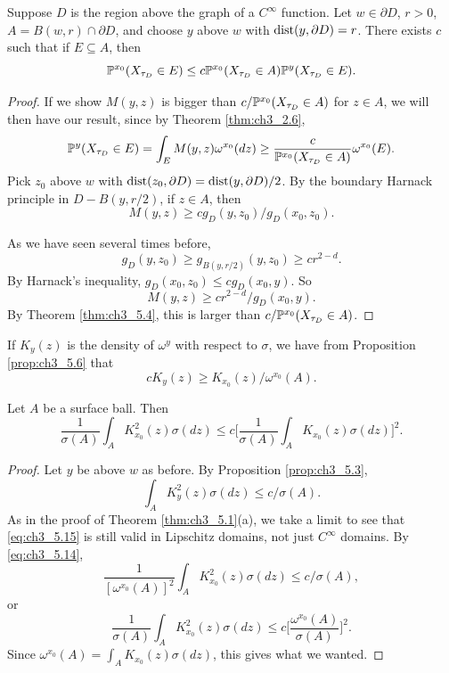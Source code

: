 \begin{proposition}\label{prop:ch3_5.6}
Suppose $D$ is the region above the graph of a $C^\infty$ function. Let $w \in \partial D$, $r > 0$, $A = B(w,r) \cap \partial D$, and choose $y$ above $w$ with $\dist(y,\partial D) = r$. There exists $c$ such that if $E \subseteq A$, then
\[
    \P^{x_0}(X_{\tau_D} \in E) \leq c\P^{x_0}(X_{\tau_D} \in A)\P^y(X_{\tau_D} \in E).
\]
\end{proposition}

\begin{proof}
If we show $M(y,z)$ is bigger than $c/\P^{x_0}(X_{\tau_D} \in A)$ for $z \in A$, we will then have our result, since by Theorem \ref{thm:ch3_2.6},
\[
    \P^y(X_{\tau_D} \in E) = \int_E M(y,z)\omega^{x_0}(dz) \geq \frac{c}{\P^{x_0}(X_{\tau_D} \in A)}\omega^{x_0}(E).
\]
Pick $z_0$ above $w$ with $\dist(z_0,\partial D) = \dist(y,\partial D)/2$. By the boundary Harnack principle in $D - B(y,r/2)$, if $z \in A$, then
\[
    M(y,z) \geq cg_D(y,z_0)/g_D(x_0,z_0).
\]

As we have seen several times before,
\[
    g_D(y,z_0) \geq g_{B(y,r/2)}(y,z_0) \geq cr^{2-d}.
\]
By Harnack's inequality, $g_D(x_0,z_0) \leq cg_D(x_0,y)$. So
\[
    M(y,z) \geq cr^{2-d}/g_D(x_0,y).
\]
By Theorem \ref{thm:ch3_5.4}, this is larger than $c/\P^{x_0}(X_{\tau_D} \in A)$.
\end{proof}

If $K_y(z)$ is the density of $\omega^y$ with respect to $\sigma$, we have from Proposition \ref{prop:ch3_5.6} that
\begin{equation}\label{eq:ch3_5.14}
    cK_y(z) \geq K_{x_0}(z)/\omega^{x_0}(A).
\end{equation}

\begin{proposition}\label{prop:ch3_5.7}
Let $A$ be a surface ball. Then
\[
    \frac{1}{\sigma(A)} \int_A K_{x_0}^2(z)\sigma(dz) \leq c\Big[\frac{1}{\sigma(A)} \int_A K_{x_0}(z)\sigma(dz)\Big]^2.
\]
\end{proposition}

\begin{proof}
Let $y$ be above $w$ as before. By Proposition \ref{prop:ch3_5.3},
\begin{equation}\label{eq:ch3_5.15}
    \int_A K_y^2(z)\sigma(dz) \leq c/\sigma(A).
\end{equation}
As in the proof of Theorem \ref{thm:ch3_5.1}(a), we take a limit to see that \eqref{eq:ch3_5.15} is still valid in Lipschitz domains, not just $C^\infty$ domains. By \eqref{eq:ch3_5.14},
\[
    \frac{1}{[\omega^{x_0}(A)]^2} \int_A K_{x_0}^2(z)\sigma(dz) \leq c/\sigma(A),
\]
or
\[
    \frac{1}{\sigma(A)} \int_A K_{x_0}^2(z)\sigma(dz) \leq c\Big[\frac{\omega^{x_0}(A)}{\sigma(A)}\Big]^2.
\]
Since $\omega^{x_0}(A) = \int_A K_{x_0}(z)\sigma(dz)$, this gives what we wanted.
\end{proof}

